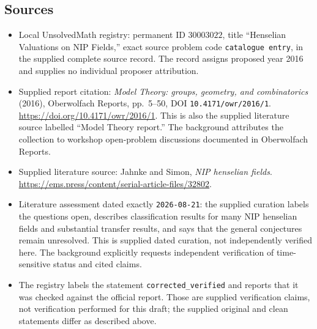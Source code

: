 \documentclass[11pt]{article}
\begin{document}
\subsection{Sources}
\begin{itemize}
\item Local UnsolvedMath registry: permanent ID \(30003022\), title ``Henselian Valuations on NIP Fields,'' exact source problem code \texttt{catalogue entry}, in the supplied complete source record. The record assigns proposed year 2016 and supplies no individual proposer attribution.
\item Supplied report citation: \emph{Model Theory: groups, geometry, and combinatorics} (2016), Oberwolfach Reports, pp.\ 5--50, DOI \texttt{10.4171/owr/2016/1}. \url{https://doi.org/10.4171/owr/2016/1}. This is also the supplied literature source labelled ``Model Theory report.'' The background attributes the collection to workshop open-problem discussions documented in Oberwolfach Reports.
\item Supplied literature source: Jahnke and Simon, \emph{NIP henselian fields}. \url{https://ems.press/content/serial-article-files/32802}.
\item Literature assessment dated exactly \texttt{2026-08-21}: the supplied curation labels the questions open, describes classification results for many NIP henselian fields and substantial transfer results, and says that the general conjectures remain unresolved. This is supplied dated curation, not independently verified here. The background explicitly requests independent verification of time-sensitive status and cited claims.
\item The registry labels the statement \texttt{corrected\_verified} and reports that it was checked against the official report. Those are supplied verification claims, not verification performed for this draft; the supplied original and clean statements differ as described above.
\end{itemize}
\end{document}
